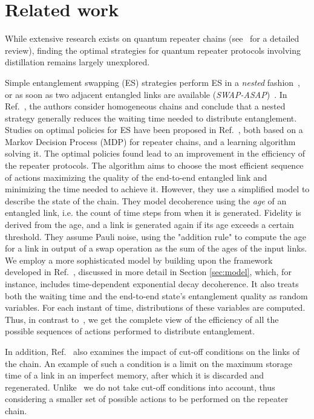 \section{Related work}
While extensive research exists on quantum repeater chains (see~\cite{Azuma_2023} for a detailed review), finding the optimal strategies for quantum repeater protocols involving distillation remains largely unexplored.

Simple entanglement swapping (ES) strategies perform ES in a \emph{nested} fashion~\cite{Briegel_1998}, or as soon as two adjacent entangled links are available (\emph{SWAP-ASAP})~\cite{goodenough2024noise}.
In Ref.~\cite{Inesta_2023}, the authors consider homogeneous chains and conclude that a nested strategy generally reduces the waiting time needed to distribute entanglement.
Studies on optimal policies for ES have been proposed in Ref.~\cite{Inesta_2023, Haldar_2024_RL}, both based on a Markov Decision Process (MDP) for repeater chains, and a learning algorithm solving it. The optimal policies found lead to an improvement in the efficiency of the repeater protocols.
% 
The algorithm aims to choose the most efficient sequence of actions maximizing the quality of the end-to-end entangled link and minimizing the time needed to achieve it. 
However, they use a simplified model to describe the state of the chain. 
% 
They model decoherence using the \emph{age} of an entangled link, i.e. the count of time steps from when it is generated. Fidelity is derived from the age, and a link is generated again if its age exceeds a certain threshold. They assume Pauli noise, using the "addition rule" to compute the age for a link in output of a swap operation as the sum of the ages of the input links.  
We employ a more sophisticated model by building upon the framework developed in Ref.~\cite{Li_2021}, discussed in more detail in Section \ref{sec:model}, which, for instance, includes time-dependent exponential decay decoherence. It also treats both the waiting time and the end-to-end state's entanglement quality as random variables. 
For each instant of time, distributions of these variables are computed.
Thus, in contrast to~\cite{Haldar_2024_RL}, we get the complete view of the efficiency of all the possible sequences of actions performed to distribute entanglement.

In addition, Ref.~\cite{Li_2021} also examines the impact of cut-off conditions on the links of the chain. An example of such a condition is a limit on the maximum storage time of a link in an imperfect memory, after which it is discarded and regenerated.
Unlike~\cite{Inesta_2023, Haldar_2024_RL, Li_2021} we do not take cut-off conditions into account, thus considering a smaller set of possible actions to be performed on the repeater chain.

